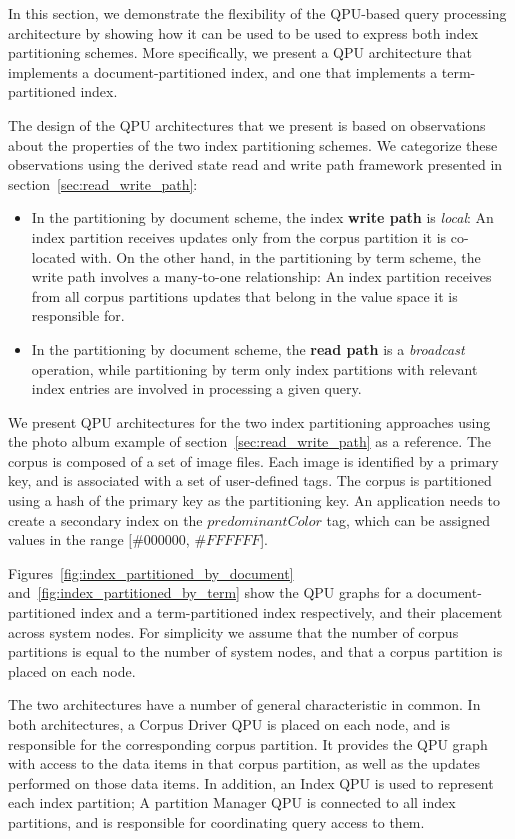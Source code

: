 \bigskip
\noindent
In this section, we demonstrate the flexibility of the QPU-based query processing architecture by showing how it can be used to
be used to express both index partitioning schemes.
More specifically,
we present a QPU architecture that implements a document-partitioned index,
and one that implements a term-partitioned index.

The design of the QPU architectures that we present is based on observations about the properties of the two index partitioning schemes.
We categorize these observations using the derived state read and write path framework presented in
section~\ref{sec:read_write_path}:
\begin{itemize}
  \item In the partitioning by document scheme,
  the index \textbf{write path} is \textit{local}:
  An index partition receives updates only from the corpus partition it is co-located with.
  On the other hand, in the partitioning by term scheme,
  the write path involves a many-to-one relationship:
  An index partition receives from all corpus partitions updates that belong in the value space it is responsible for.

  \item In the partitioning by document scheme,
  the \textbf{read path} is a \textit{broadcast} operation,
  while partitioning by term
  only index partitions with relevant index entries are involved in processing a given query.
\end{itemize}

We present QPU architectures for the two index partitioning approaches using the photo album example of section~\ref{sec:read_write_path} as a reference.
The corpus is composed of a set of image files.
Each image is identified by a primary key, and is associated with a set of user-defined tags.
The corpus is partitioned using a hash of the primary key as the partitioning key.
An application needs to create a secondary index on the $predominantColor$ tag, which can be assigned values in the range $[\#000000$, $\#FFFFFF$].

Figures~\ref{fig:index_partitioned_by_document} and~\ref{fig:index_partitioned_by_term} show the QPU graphs for a
document-partitioned index and a term-partitioned index respectively, and their placement across system nodes.
For simplicity we assume that the number of corpus partitions is equal to the number of system nodes,
and that a corpus partition is placed on each node.

The two architectures have a number of general characteristic in common.
In both architectures, a Corpus Driver QPU is placed on each node,
and is responsible for the corresponding corpus partition.
It provides the QPU graph with access to the data items in that corpus partition,
as well as the updates performed on those data items.
In addition, an Index QPU is used to represent each index partition;
A partition Manager QPU is connected to all index partitions,
and is responsible for coordinating query access to them.

